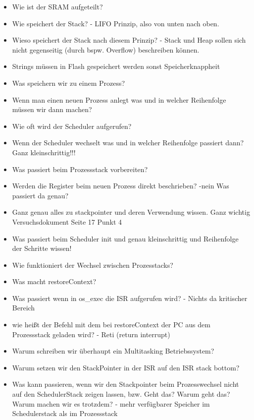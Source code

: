 \documentclass[12pt,a4paper]{article}
\begin{document}
\begin{itemize}
\item Wie ist der SRAM aufgeteilt?
\item Wie speichert der Stack? - LIFO Prinzip, also von unten nach oben.
\item Wieso speichert der Stack nach diesem Prinzip? - Stack und Heap sollen sich nicht gegenseitig (durch bspw. Overflow) beschreiben können.
\item Strings müssen in Flash gespeichert werden sonst Speicherknappheit
\item Was speichern wir zu einem Prozess?
\item Wenn man einen neuen Prozess anlegt was und in welcher Reihenfolge müssen wir dann machen?
\item Wie oft wird der Scheduler aufgerufen?
\item Wenn der Scheduler wechselt was und in welcher Reihenfolge passiert dann? Ganz kleinschrittig!!!
\item Was passiert beim Prozessstack vorbereiten?
\item Werden die Register beim neuen Prozess direkt beschrieben? -nein Was passiert da genau?
\item Ganz genau alles zu stackpointer und deren Verwendung wissen. Ganz wichtig Versuchsdokument Seite 17 Punkt 4
\item Was passiert beim Scheduler init und genau kleinschrittig und Reihenfolge der Schritte wissen!
\item Wie funktioniert der Wechsel zwischen Prozesstacks?
\item Was macht restoreContext?
\item Was passiert wenn in os\_exec die ISR aufgerufen wird? - Nichts da kritischer Bereich
\item wie heißt der Befehl mit dem bei restoreContext der PC aus dem Prozessstack geladen wird? - Reti (return interrupt)
\item Warum schreiben wir überhaupt ein Multitasking Betriebssystem?
\item Warum setzen wir den StackPointer in der ISR auf den ISR stack bottom?
\item Was kann passieren, wenn wir den Stackpointer beim Prozesswechsel nicht auf den SchedulerStack zeigen lassen, bzw. Geht das? Warum geht das? Warum machen wir es trotzdem? - mehr verfügbarer Speicher im Schedulerstack als im Prozessstack
\end{itemize}
\end{document}
